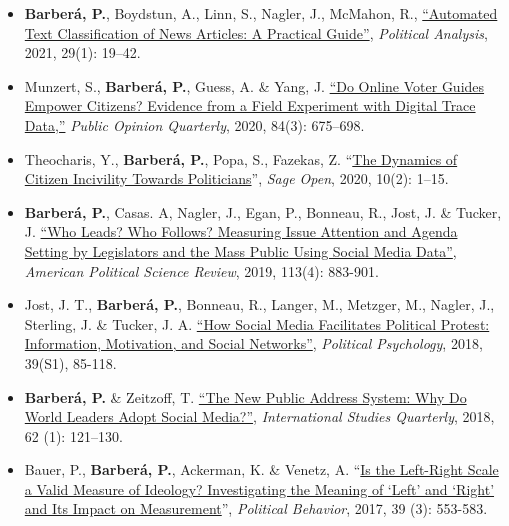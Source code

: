 \documentclass[margin,line,11pt]{resume}
\begin{document}
\begin{resume}
\begin{itemize}[leftmargin=5.5mm]
\item[20.] \textbf{Barber\'{a}, P.}, Boydstun, A., Linn, S., Nagler, J., McMahon, R.,  \href{https://www.cambridge.org/core/journals/political-analysis/article/automated-text-classification-of-news-articles-a-practical-guide/10462DB284B1CD80C0FAE796AD786BC6}{``Automated Text Classification of News Articles: A Practical Guide''}, \textit{Political Analysis}, 2021, 29(1): 19--42.

\item[19.] Munzert, S., \textbf{Barber\'{a}, P.}, Guess, A. \& Yang, J. \href{https://academic.oup.com/poq/advance-article/doi/10.1093/poq/nfaa037/6104133}{``Do Online Voter Guides Empower Citizens? Evidence from a Field Experiment with Digital Trace Data,''} \textit{Public Opinion Quarterly}, 2020, 84(3): 675--698.

\item[18.] Theocharis, Y., \textbf{Barber\'{a}, P.}, Popa, S., Fazekas, Z. ``\href{https://journals.sagepub.com/doi/full/10.1177/2158244020919447}{The Dynamics of Citizen Incivility Towards Politicians}'', \textit{Sage Open}, 2020, 10(2): 1--15.

\newpage 

\item[17.] \textbf{Barber\'{a}, P.}, Casas. A, Nagler, J., Egan, P., Bonneau, R., Jost, J. \& Tucker, J. \href{https://t.co/6KnjCczsqH}{``Who Leads? Who Follows? Measuring Issue Attention and Agenda Setting by Legislators and the Mass Public Using Social Media Data''}, \textit{American Political Science Review}, 2019, 113(4): 883-901.

\item[16.] Jost, J. T., \textbf{Barber\'{a}, P.}, Bonneau, R., Langer, M., Metzger, M., Nagler, J., Sterling, J. \& Tucker, J. A. \href{http://onlinelibrary.wiley.com/doi/10.1111/pops.12478/full}{``How Social Media Facilitates Political Protest: Information, Motivation, and Social Networks''}, \textit{Political Psychology}, 2018, 39(S1), 85-118.

\item[15.] \textbf{Barber\'{a}, P.} \& Zeitzoff, T. \href{https://academic.oup.com/isq/article/doi/10.1093/isq/sqx047/4430887/The-New-Public-Address-System-Why-Do-World-Leaders}{``The New Public Address System: Why Do World Leaders Adopt Social Media?''}, \textit{International Studies Quarterly}, 2018, 62 (1): 121--130.
    
\item[14.] Bauer, P., \textbf{Barber\'{a}, P.}, Ackerman, K. \& Venetz, A. ``\href{http://link.springer.com/article/10.1007/s11109-016-9368-2}{Is the Left-Right Scale a Valid Measure of Ideology? Investigating the Meaning of `Left' and `Right' and Its Impact on Measurement}'', \textit{Political Behavior}, 2017, 39 (3): 553-583.


\end{itemize}
\end{resume}
\end{document}
